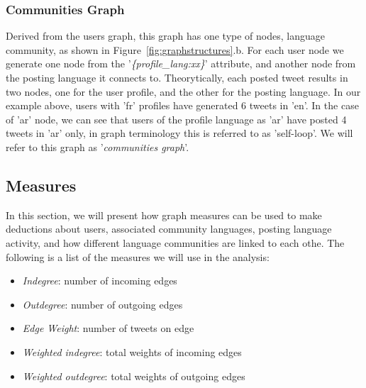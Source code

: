 \documentclass{llncs}
\begin{document}
\subsubsection{Communities Graph} \label{communitiesgraph}
Derived from the users graph, this graph has one type of nodes, language community,
as shown in Figure~\ref{fig:graphstructures}.b. For each user node we generate one 
node from the '{\emph{\{profile\_lang:xx\}}}' attribute, and another node from the posting 
language it connects to. Theorytically, each posted tweet results in two nodes, one for 
the user profile, and the other for the posting language. In our example above, users 
with 'fr' profiles have generated 6 tweets in 'en'. In the case of 'ar' node, we can see that 
users of the profile language as 'ar' have posted 4 tweets in 'ar' only, in graph terminology
this is referred to as 'self-loop'. We will refer to this graph as '\emph{communities graph}'.

\subsection{Measures}
In this section, we will present how graph measures can be used to 
make deductions about users, associated community languages, posting language
activity, and how different language communities are linked to each othe. 
The following is a list of the measures we will use in the analysis: 
\begin{itemize}
\item \emph{Indegree}: number of incoming edges
\item \emph{Outdegree}: number of outgoing edges
\item \emph{Edge Weight}: number of tweets on edge
\item \emph{Weighted indegree}: total weights of incoming edges
\item \emph{Weighted outdegree}: total weights of outgoing edges
\end{itemize}
\end{document}
